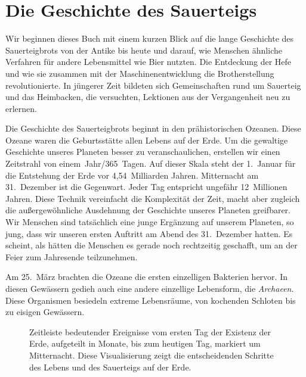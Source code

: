 \chapter{Die Geschichte des Sauerteigs}%
\label{ch:history}
\begin{quoting}
    Wir beginnen dieses Buch mit einem kurzen Blick auf die lange Geschichte
    des Sauerteigbrots von der Antike bis heute und darauf, wie Menschen
    ähnliche Verfahren für andere Lebensmittel wie Bier nutzten. Die Entdeckung
    der Hefe und wie sie zusammen mit der Maschinenentwicklung die
    Brotherstellung revolutionierte. In jüngerer Zeit bildeten sich
    Gemeinschaften rund um Sauerteig und das Heimbacken, die versuchten,
    Lektionen aus der Vergangenheit neu zu erlernen.
\end{quoting}

Die Geschichte des Sauerteigbrots beginnt in den prähistorischen Ozeanen. Diese Ozeane
waren die Geburtsstätte allen Lebens auf der Erde. Um die gewaltige Geschichte
unseres Planeten besser zu veranschaulichen, erstellen wir einen Zeitstrahl von einem~Jahr/365~Tagen.
Auf dieser Skala steht der 1.~Januar für die Entstehung der Erde
vor 4,54~Milliarden Jahren. Mitternacht am 31.~Dezember ist die Gegenwart.
Jeder Tag entspricht ungefähr 12~Millionen Jahren. Diese Technik vereinfacht die
Komplexität der Zeit, macht aber zugleich die außergewöhnliche Ausdehnung der Geschichte
unseres Planeten greifbarer. Wir Menschen sind tatsächlich eine junge
Ergänzung auf unserem Planeten, so jung, dass wir unseren ersten Auftritt
am Abend des 31.~Dezember hatten. Es scheint, als hätten die Menschen es gerade
noch rechtzeitig geschafft, um an der Feier zum Jahresende teilzunehmen.

Am 25.~März brachten die Ozeane die ersten einzelligen Bakterien hervor. In diesen
Gewässern gedieh auch eine andere einzellige Lebensform, die \emph{Archaeen}. Diese
Organismen besiedeln extreme Lebensräume, von kochenden Schloten bis zu eisigen Gewässern.

\begin{figure}[!htb]
  \centering
  
  \caption[Zeitleiste der Sauerteig-Mikrobiologie]{Zeitleiste bedeutender Ereignisse
    vom ersten Tag der Existenz der Erde,
    aufgeteilt in Monate, bis zum heutigen Tag,
    markiert um Mitternacht. Diese Visualisierung zeigt die entscheidenden Schritte
    des Lebens und des Sauerteigs auf der Erde.}%
  \label{fig:planet-timeline}
\end{figure}

